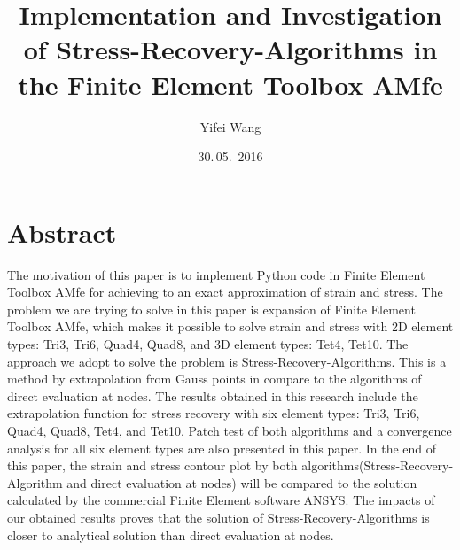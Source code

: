 \documentclass[nenglish]{AMsemesterArbeit}
\author{Yifei Wang}
\title{%
	Implementation and Investigation of Stress-Recovery-Algorithms in the Finite Element Toolbox AMfe
	}
\date{30.\,05.~2016}
\begin{document}
\renewcommand{\arraystretch}{2.5}
\frontmatter
\maketitle
\section*{Abstract}
The motivation of this paper is to implement Python code in Finite Element Toolbox AMfe for achieving to an exact approximation of strain and stress. The problem we are trying to solve in this paper is expansion of Finite Element Toolbox AMfe, which makes it possible to solve strain and stress with 2D element types: Tri3, Tri6, Quad4, Quad8, and 3D element types: Tet4, Tet10. The approach we adopt to solve the problem is Stress-Recovery-Algorithms. This is a method by extrapolation from Gauss points in compare to the algorithms of direct evaluation at nodes. The results obtained in this research include the extrapolation function for stress recovery with six element types: Tri3, Tri6, Quad4, Quad8, Tet4, and Tet10. Patch test of both algorithms and a convergence analysis for all six element types are also presented in this paper. In the end of this paper, the strain and stress contour plot by both algorithms(Stress-Recovery-Algorithm and direct evaluation at nodes) will be compared to the solution calculated by the commercial Finite Element software ANSYS. The impacts of our obtained results proves that the solution of Stress-Recovery-Algorithms is closer to analytical solution than direct evaluation at nodes.  



\PrintTablesAndListsOfContents
\mainmatter

\backmatter
\AMPrintBibliography
\end{document}
